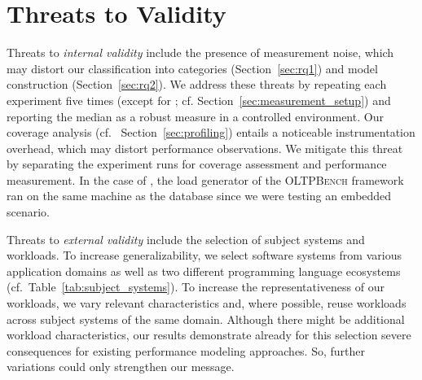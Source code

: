 {{{


\section{Threats to Validity}\label{sec:threats}
Threats to \textit{internal validity} include the presence of  measurement noise, 
which may distort our classification into categories (Section~\ref{sec:rq1}) and model construction (Section~\ref{sec:rq2}). We address these threats by repeating each experiment five times  (except for \htwo; cf. Section~\ref{sec:measurement_setup}) and reporting the median as a robust measure in a controlled environment. Our coverage analysis (cf.~ Section~\ref{sec:profiling}) entails a noticeable instrumentation overhead, which may distort performance observations. We mitigate this threat by separating the experiment runs for coverage assessment and performance measurement. In the case of \htwo, the load generator of the \textsc{OLTPBench} framework~\cite{difallah_oltp_2013} ran on the same machine as the database since we were testing an embedded scenario. 	
	
Threats to\textit{ external validity} include the selection of subject systems and workloads. To increase generalizability, we select software systems from various application domains as well as two different programming language ecosystems (cf.~Table~\ref{tab:subject_systems}). To increase the representativeness of our workloads, we vary relevant characteristics %
and, where possible, reuse workloads across subject systems of the same domain. Although there might be additional workload characteristics, our results demonstrate already for this selection severe consequences for existing performance modeling approaches. So, further variations could only strengthen our message.

	

}}}
